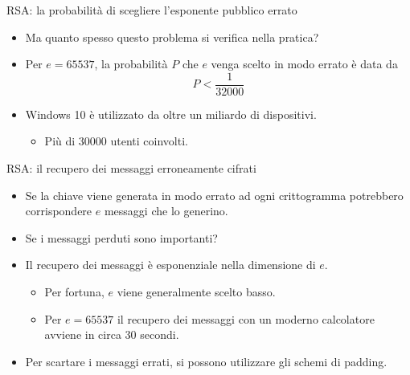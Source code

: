 \documentclass[11pt,svgnames,smaller,aspectratio=169,italian]{beamer}
\begin{document}
\begin{frame}{RSA: la probabilità di scegliere l'esponente pubblico errato}
	\begin{itemize}
		\item Ma quanto spesso questo problema si verifica nella pratica?
		\item Per $e = 65537$, la probabilità $P$ che $e$ venga scelto in modo errato è data da
			\begin{equation*}
				P < \frac{1}{32000}
			\end{equation*}
		\item Windows 10 è utilizzato da oltre un miliardo di dispositivi.
			\begin{itemize}
				\item Più di 30000 utenti coinvolti.
			\end{itemize}
	\end{itemize}
\end{frame}

\begin{frame}{RSA: il recupero dei messaggi erroneamente cifrati}
	\begin{itemize}
		\item Se la chiave viene generata in modo errato ad ogni crittogramma potrebbero corrispondere $e$ messaggi che lo generino.
		\item Se i messaggi perduti sono importanti?
		\item Il recupero dei messaggi è esponenziale nella dimensione di $e$.
			\begin{itemize}
				\item Per fortuna, $e$ viene generalmente scelto basso.
				\item Per $e = 65537$ il recupero dei messaggi con un moderno calcolatore avviene in circa 30 secondi.
			\end{itemize}
		\item Per scartare i messaggi errati, si possono utilizzare gli schemi di padding.
	\end{itemize}
\end{frame}
\end{document}
